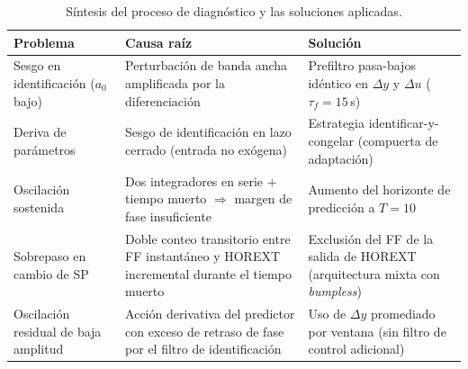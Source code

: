 \begin{table}[H]
\centering
\begin{tabularx}{\textwidth}{lXX}
\toprule
\textbf{Problema} & \textbf{Causa raíz} & \textbf{Solución} \\
\midrule
Sesgo en identificación ($a_0$ bajo) & Perturbación de banda ancha amplificada por la diferenciación & Prefiltro pasa-bajos idéntico en $\Delta y$ y $\Delta u$ ($\tau_f = 15\,$s) \\
\addlinespace
Deriva de parámetros & Sesgo de identificación en lazo cerrado (entrada no exógena) & Estrategia identificar-y-congelar (compuerta de adaptación) \\
\addlinespace
Oscilación sostenida & Dos integradores en serie + tiempo muerto $\Rightarrow$ margen de fase insuficiente & Aumento del horizonte de predicción a $T=10$ \\
\addlinespace
Sobrepaso en cambio de SP & Doble conteo transitorio entre FF instantáneo y HOREXT incremental durante el tiempo muerto & Exclusión del FF de la salida de HOREXT (arquitectura mixta con \textit{bumpless}) \\
\addlinespace
Oscilación residual de baja amplitud & Acción derivativa del predictor con exceso de retraso de fase por el filtro de identificación & Uso de $\Delta y$ promediado por ventana (sin filtro de control adicional) \\
\bottomrule
\end{tabularx}
\caption{Síntesis del proceso de diagnóstico y las soluciones aplicadas.}
\end{table}

